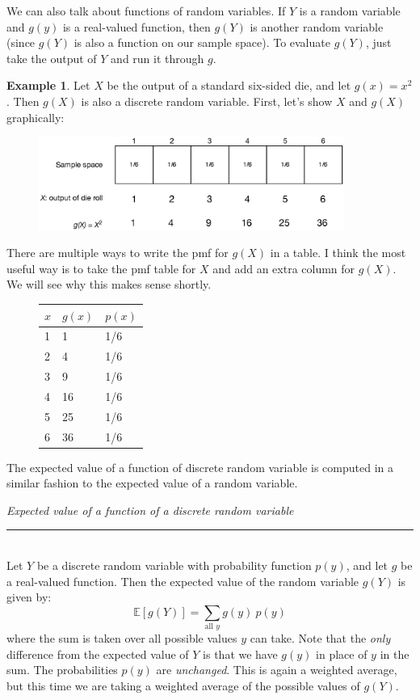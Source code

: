 \documentclass[12pt]{article}
\theoremstyle{definition}
\newtheorem*{example}{Example}
\theoremstyle{remark}
\def\E{{\mathbb E}}
\begin{document}

We can also talk about functions of random variables. If $Y$ is a random variable and $g(y)$ is a real-valued function, then $g(Y)$ is another random variable (since $g(Y)$ is also a function on our sample space). To evaluate $g(Y)$, just take the output of $Y$ and run it through $g$. 

\begin{example}
Let $X$ be the output of a standard six-sided die, and let $g(x) = x^2$. Then $g(X)$ is also a discrete random variable. First, let's show $X$ and $g(X)$ graphically:
\begin{figure}[H]
\centering
\includegraphics[width=10cm]{1diesquared}
\end{figure}
There are multiple ways to write the pmf for $g(X)$ in a table. I think the most useful way is to take the pmf table for $X$ and add an extra column for $g(X)$. We will see why this makes sense shortly.
\begin{figure}[H]
\centering
\begin{tabular}{l@{\hskip 2cm}l@{\hskip 2cm}l}
\toprule
$x$ & $g(x)$ & $p(x)$\\
\midrule
1 & 1 & 1/6\\
2 & 4 & 1/6\\
3 & 9 & 1/6\\
4 & 16 & 1/6\\
5 & 25 & 1/6\\
6 & 36 & 1/6\\
\bottomrule
\end{tabular}
\end{figure}

\end{example}

The expected value of a function of discrete random variable is computed in a similar fashion to the expected value of a random variable.

\begin{framed}
  \emph{Expected value of a function of a discrete random variable}\\
  \rule{\dimexpr{}\fboxrule}{.1pt} \\
Let $Y$ be a discrete random variable with probability function $p(y)$, and let $g$ be a real-valued function. Then the expected value of the random variable $g(Y)$ is given by:
\[
\E[g(Y)] = \sum_{\text{all }y}g(y)\:p(y)
\]
where the sum is taken over all possible values $y$ can take. Note that the \emph{only} difference from the expected value of $Y$ is that we have $g(y)$ in place of $y$ in the sum. The probabilities $p(y)$ are \emph{unchanged}. This is again a weighted average, but this time we are taking a weighted average of the possible values of $g(Y)$.
\end{framed}
\end{document}
